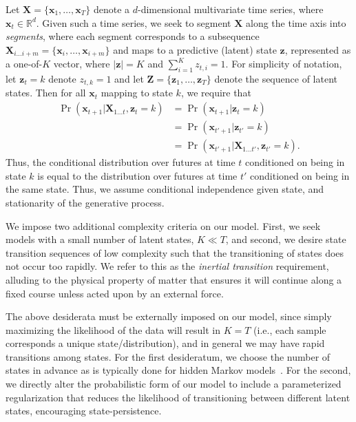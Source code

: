 \documentclass[letterpaper]{article}
\begin{document}
Let $\mathbf{X} = \{\mathbf{x}_1, \ldots, \mathbf{x}_T\}$ denote a $d$-dimensional multivariate time series, where $\mathbf{x}_t \in \mathbb{R}^d$. Given such a time series, we seek to segment $\mathbf{X}$ along the time axis into \emph{segments}, where each segment corresponds to a subsequence $\mathbf{X}_{i\ldots i+m} = \{\mathbf{x}_i, \ldots, \mathbf{x}_{i+m}\}$ and maps to a predictive (latent) state $\mathbf{z}$, represented as a one-of-$K$ vector, where $|\mathbf{z}| = K$ and $\sum_{i=1}^{K}z_{t,i} = 1$. For simplicity of notation, let $\mathbf{z}_{t} = k$ denote $z_{t,k} = 1$ and let $\mathbf{Z} = \{\mathbf{z}_1, \ldots, \mathbf{z}_T\}$ denote the sequence of latent states. Then for all $\mathbf{x}_{t}$ mapping to state $k$, we require that
\begin{align*}
    \Pr(\mathbf{x}_{t+1}|\mathbf{X}_{1\ldots t}, \mathbf{z}_t = k) &= \Pr(\mathbf{x}_{t+1}| \mathbf{z}_t = k) \\
                                                                   &= \Pr(\mathbf{x}_{t'+1}| \mathbf{z}_{t'} = k) \\
                                                                   &= \Pr(\mathbf{x}_{t'+1}| \mathbf{X}_{1\ldots t'}, \mathbf{z}_{t'} = k).
\end{align*}
Thus, the conditional distribution over futures at time $t$ conditioned on being in state $k$ is equal to the distribution over futures at time $t'$ conditioned on being in the same state. Thus, we assume conditional independence given state, and stationarity of the generative process.

We impose two additional complexity criteria on our model. First, we seek models with a small number of latent states, $K \ll T$, and second, we desire state transition sequences of low complexity such that the transitioning of states does not occur too rapidly. We refer to this as the \emph{inertial transition} requirement, alluding to the physical property of matter that ensures it will continue along a fixed course unless acted upon by an external force. 

The above desiderata must be externally imposed on our model, since simply maximizing the likelihood of the data will result in $K = T$ (i.e., each sample corresponds a unique state/distribution), and in general we may have rapid transitions among states. For the first desideratum,  we choose the number of states in advance as is typically done for hidden Markov models~\cite{rabiner1989tutorial}. For the second, we directly alter the probabilistic form of our model to include a parameterized regularization that reduces the likelihood of transitioning between different latent states, encouraging state-persistence.
\end{document}
